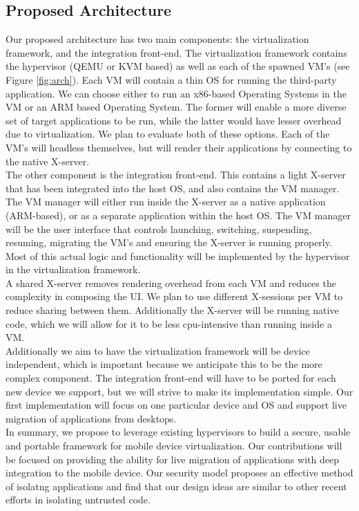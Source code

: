 \subsection{Proposed Architecture}
\label{sec:proposedarch}
Our proposed architecture has two main components: the virtualization framework, and the integration front-end.  The virtualization framework contains the hypervisor (QEMU or KVM based) as well as each of the spawned VM's (see Figure \ref{fig:arch}).  Each VM will contain a thin OS for running the third-party application.  We can choose either to run an x86-based Operating Systems in the VM or an ARM based Operating System. The former will enable a more diverse set of target applications to be run, while the latter would have lesser overhead due to virtualization. We plan to evaluate both of these options. Each of the VM's will headless themselves, but will render their applications by connecting to the native X-server. \\

The other component is the integration front-end.  This contains a light X-server that has been integrated into the host OS, and also contains the VM manager.  The VM manager will either run inside the X-server as a native application (ARM-based), or as a separate application within the host OS.  The VM manager will be the user interface that controls launching, switching, suspending, resuming, migrating the VM's and ensuring the X-server is running properly. Most of this actual logic and functionality will be implemented by the hypervisor in the virtualization framework.\\

A shared X-server removes rendering overhead from each VM and reduces the complexity in composing the UI. We plan to use different X-sessions per VM to reduce sharing between them. Additionally the X-server will be running native code, which we will allow for it to be less cpu-intensive than running inside a VM. \\

Additionally we aim to have the virtualization framework will be device independent, which is important because we anticipate this to be the more complex component.  The integration front-end will have to be ported for each new device we support, but we will strive to make its implementation simple. Our first implementation will focus on one particular device and OS and support live migration of applications from desktops. \\

In summary, we propose to leverage existing hypervisors to build a secure, usable and portable framework for mobile device virtualization. Our contributions will be focused on providing the ability for live migration of applications with deep integration to the mobile device. Our security model proposes an effective method of isolatng applications and find that our design ideas are similar to other recent efforts \cite{grier2008secure} in isolating untrusted code.
